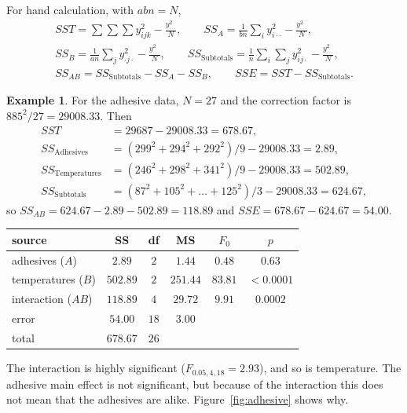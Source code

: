 \documentclass[11pt,a4paper]{article}
\numberwithin{equation}{section}
\theoremstyle{definition}
\newtheorem{exa}[thm]{Example}
\begin{document}
For hand calculation, with $abn = N$,
\begin{gather*}
SST = \sum\sum\sum y_{ijk}^2 - \frac{y_{\cdot\cdot\cdot}^2}{N} , \qquad SS_A = \frac{1}{bn}\sum_iy_{i\cdot\cdot}^2 - \frac{y_{\cdot\cdot\cdot}^2}{N} , \\
SS_B = \frac{1}{an}\sum_jy_{\cdot j\cdot}^2 - \frac{y_{\cdot\cdot\cdot}^2}{N} , \qquad SS_{\mathrm{Subtotals}} = \frac1n\sum_i\sum_jy_{ij\cdot}^2 - \frac{y_{\cdot\cdot\cdot}^2}{N} , \\
SS_{AB} = SS_{\mathrm{Subtotals}} - SS_A - SS_B , \qquad SSE = SST - SS_{\mathrm{Subtotals}} .
\end{gather*}

\begin{exa}\label{exa:adhesive-anova}
For the adhesive data, $N = 27$ and the correction factor is $885^2/27 = 29008.33$. Then
\begin{align*}
SST &= 29687 - 29008.33 = 678.67 , \\
SS_{\mathrm{Adhesives}} &= (299^2 + 294^2 + 292^2)/9 - 29008.33 = 2.89 , \\
SS_{\mathrm{Temperatures}} &= (246^2 + 298^2 + 341^2)/9 - 29008.33 = 502.89 , \\
SS_{\mathrm{Subtotals}} &= (87^2 + 105^2 + \dots + 125^2)/3 - 29008.33 = 624.67 ,
\end{align*}
so $SS_{AB} = 624.67 - 2.89 - 502.89 = 118.89$ and $SSE = 678.67 - 624.67 = 54.00$.
\begin{center}
\begin{tabular}{l|c|c|c|c|c}
source & SS & df & MS & $F_0$ & $p$ \\
\hline
adhesives ($A$) & $2.89$ & $2$ & $1.44$ & $0.48$ & $0.63$ \\
temperatures ($B$) & $502.89$ & $2$ & $251.44$ & $83.81$ & $< 0.0001$ \\
interaction ($AB$) & $118.89$ & $4$ & $29.72$ & $9.91$ & $0.0002$ \\
error & $54.00$ & $18$ & $3.00$ & & \\
\hline
total & $678.67$ & $26$ & & &
\end{tabular}
\end{center}
The interaction is highly significant ($F_{0.05,4,18} = 2.93$), and so is temperature. The adhesive main effect is not significant, but because of the
interaction this does not mean that the adhesives are alike. Figure~\ref{fig:adhesive} shows why.
\end{exa}
\end{document}
